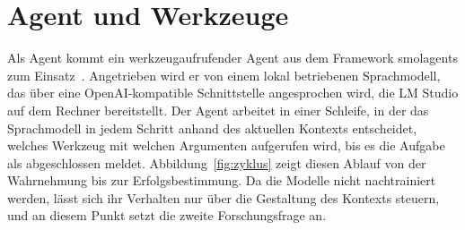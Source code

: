 \section{Agent und Werkzeuge}
\label{sec:impl-agent}

Als Agent kommt ein werkzeugaufrufender Agent aus dem Framework smolagents zum Einsatz~\cite{smolagents}.
Angetrieben wird er von einem lokal betriebenen Sprachmodell, das über eine OpenAI-kompatible Schnittstelle angesprochen wird, die LM Studio auf dem Rechner bereitstellt.
Der Agent arbeitet in einer Schleife, in der das Sprachmodell in jedem Schritt anhand des aktuellen Kontexts entscheidet, welches Werkzeug mit welchen Argumenten aufgerufen wird, bis es die Aufgabe als abgeschlossen meldet.
Abbildung~\ref{fig:zyklus} zeigt diesen Ablauf von der Wahrnehmung bis zur Erfolgsbestimmung.
Da die Modelle nicht nachtrainiert werden, lässt sich ihr Verhalten nur über die Gestaltung des Kontexts steuern, und an diesem Punkt setzt die zweite Forschungsfrage an.

